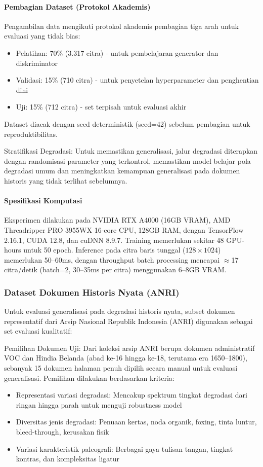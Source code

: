\documentclass[journal]{IEEEtran}
\begin{document}
\paragraph{Pembagian Dataset (Protokol Akademis)}
Pengambilan data mengikuti protokol akademis pembagian tiga arah untuk evaluasi yang tidak bias:
\begin{itemize}
    \item Pelatihan: 70\% (3.317 citra) - untuk pembelajaran generator dan diskriminator
    \item Validasi: 15\% (710 citra) - untuk penyetelan hyperparameter dan penghentian dini  
    \item Uji: 15\% (712 citra) - set terpisah untuk evaluasi akhir
\end{itemize}

Dataset diacak dengan seed deterministik (seed=42) sebelum pembagian untuk reproduktibilitas.

Stratifikasi Degradasi:
Untuk memastikan generalisasi, jalur degradasi diterapkan dengan randomisasi parameter yang terkontrol, memastikan model belajar pola degradasi umum dan meningkatkan kemampuan generalisasi pada dokumen historis yang tidak terlihat sebelumnya.

\paragraph{Spesifikasi Komputasi} Eksperimen dilakukan pada NVIDIA RTX A4000 (16GB VRAM), AMD Threadripper PRO 3955WX 16-core CPU, 128GB RAM, dengan TensorFlow 2.16.1, CUDA 12.8, dan cuDNN 8.9.7. Training memerlukan sekitar 48 GPU-hours untuk 50 epoch. Inference pada citra baris tunggal ($128\times1024$) memerlukan 50--60ms, dengan throughput batch processing mencapai $\approx$17 citra/detik (batch=2, 30--35ms per citra) menggunakan 6--8GB VRAM.

\subsubsection{Dataset Dokumen Historis Nyata (ANRI)}

Untuk evaluasi generalisasi pada degradasi historis nyata, subset dokumen representatif dari Arsip Nasional Republik Indonesia (ANRI) digunakan sebagai set evaluasi kualitatif:

Pemilihan Dokumen Uji: Dari koleksi arsip ANRI berupa dokumen administratif VOC dan Hindia Belanda (abad ke-16 hingga ke-18, terutama era 1650--1800), sebanyak 15 dokumen halaman penuh dipilih secara manual untuk evaluasi generalisasi. Pemilihan dilakukan berdasarkan kriteria:
\begin{itemize}
    \item Representasi variasi degradasi: Mencakup spektrum tingkat degradasi dari ringan hingga parah untuk menguji robustness model
    \item Diversitas jenis degradasi: Penuaan kertas, noda organik, foxing, tinta luntur, bleed-through, kerusakan fisik
    \item Variasi karakteristik paleografi: Berbagai gaya tulisan tangan, tingkat kontras, dan kompleksitas ligatur
\end{itemize}
\end{document}

